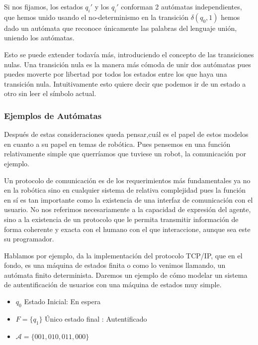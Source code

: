 Si nos fijamos, los estados $q_i'$ y los $q_i'$ conforman 2 autómatas independientes, que hemos unido usando el no-determinismo en la transición $\delta(q_0,1)$ hemos dado un autómata que reconoce únicamente las palabras del lenguaje unión, uniendo los autómatas.

\vspace{10px}

Esto se puede extender todavía más, introduciendo el concepto de las transiciones nulas. Una transición nula es la manera más cómoda de unir dos autómatas pues puedes moverte por libertad por todos los estados entre los que haya una transición nula. Intuitivamente esto quiere decir que podemos ir de un estado a otro sin leer el símbolo actual. 


\subsubsection{Ejemplos de Autómatas}

Después de estas consideraciones queda pensar,cuál es el papel de estos modelos en cuanto a su papel en temas de robótica. Pues pensemos en una función relativamente simple que querríamos que tuviese un robot, la comunicación por ejemplo.

\vspace{10px}

Un protocolo de comunicación es de los requerimientos más fundamentales ya no en la robótica sino en cualquier sistema de relativa complejidad pues la función en sí es tan importante como la existencia de una interfaz de comunicación con el usuario. No nos referimos necesariamente a la capacidad de expresión del agente, sino a la existencia de un protocolo que le permita transmitir información de forma coherente y exacta con el humano con el que interaccione, aunque sea este su programador.

\vspace{10px}

Hablamos por ejemplo, da la implementación del protocolo TCP/IP, que en el fondo, es una máquina de estados finita o como lo venimos llamando, un autómata finito determinista. Daremos un ejemplo de cómo modelar un sistema de autentificación de usuarios con una máquina de estados muy simple.

\begin{itemize}
	\item $q_0$ Estado Inicial: En espera
	\item $F=\{q_1\}$ Único estado final : Autentificado
	\item $\mathcal{A}=\{001,010,011,000\}$
\end{itemize}

